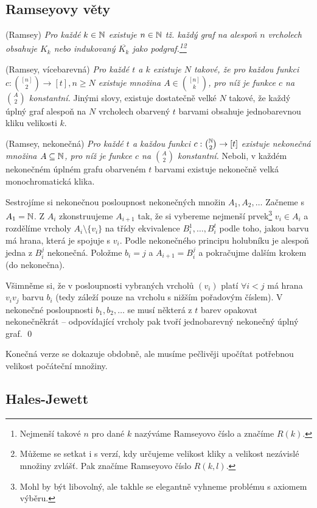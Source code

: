 \subsection{Ramseyovy věty}

\vt (Ramsey) {\it Pro každé $k \in \mathbb{N}$ existuje $n \in \mathbb{N}$ tž. každý graf na alespoň $n$ vrcholech obsahuje $K_k$ nebo indukovaný $\overline{K_k}$ jako podgraf.\footnote{Nejmenší takové $n$ pro dané $k$ nazýváme Ramseyovo číslo a značíme $R(k)$.}\footnote{Můžeme se setkat i s verzí, kdy určujeme velikost kliky a velikost nezávislé množiny zvlášť. Pak značíme Ramseyovo číslo $R(k,l)$.}}

\vt (Ramsey, vícebarevná) {\it Pro každé $t$ a $k$ existuje $N$ takové, že pro každou funkci $c: {[n]\choose 2} \rightarrow [t], n\geq N$ existuje množina $A \in {[n]\choose k}$, pro níž je funkce $c$ na $A\choose 2$ konstantní.} Jinými slovy, existuje dostatečně velké $N$ takové, že každý úplný graf alespoň na $N$ vrcholech obarvený $t$ barvami obsahuje jednobarevnou kliku velikosti $k$.

\vt (Ramsey, nekonečná) {\it Pro každé $t$ a každou funkci $c: {\mathbb{N}\choose 2} \rightarrow [t]$ existuje nekonečná množina $A\subseteq \mathbb{N}$, pro níž je funkce $c$ na $A\choose 2$ konstantní.} Neboli, v každém nekonečném úplném grafu obarveném $t$ barvami existuje nekonečně velká monochromatická klika.

\dk Sestrojíme si nekonečnou posloupnost nekonečných množin $A_1, A_2, \dots$ Začneme s $A_1 = \mathbb{N}$. Z $A_i$ zkonstruujeme $A_{i+1}$ tak, že si vybereme nejmenší prvek\footnote{Mohl by být libovolný, ale takhle se elegantně vyhneme problému s axiomem výběru.} $v_i \in A_i$ a rozdělíme vrcholy $A_i \setminus \{v_i\}$ na třídy ekvivalence $B_i^1, \dots, B_i^t$ podle toho, jakou barvu má hrana, která je spojuje s $v_i$. Podle nekonečného principu holubníku je alespoň jedna z $B_i^j$ nekonečná. Položme $b_i = j$ a $A_{i+1} = B_i^j$ a pokračujme dalším krokem (do nekonečna).

Všimněme si, že v posloupnosti vybraných vrcholů $(v_i)$ platí $\forall i < j$ má hrana $v_iv_j$ barvu $b_i$ (tedy záleží pouze na vrcholu s nižším pořadovým číslem). V nekonečné posloupnosti $b_1,b_2,\dots$ se musí některá z $t$ barev opakovat nekonečněkrát -- odpovídající vrcholy pak tvoří jednobarevný nekonečný úplný graf.
\qed

Konečná verze se dokazuje obdobně, ale musíme pečlivěji upočítat potřebnou velikost počáteční množiny.

\subsection{Hales-Jewett}

